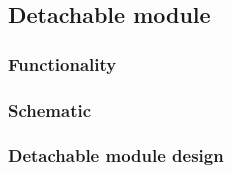 \newpage
\subsection{Detachable module}
\label{subsec:detachable_module} 

\subsubsection{Functionality}
\label{subsubsec:detachable_module/functionality} 

\subsubsection{Schematic}
\label{subsubsec:detachable_module/schematic} 

\subsubsection{Detachable module design}
\label{subsubsec:detachable_module/design} 